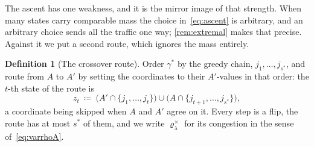 \documentclass[aos]{imsart}
\theoremstyle{plain}
\theoremstyle{definition}
\newtheorem{definition}{Definition}[section]
\begin{document}
    The ascent has one weakness, and it is the mirror image of that
    strength. When many states carry comparable mass the choice
    in~\eqref{eq:ascent} is arbitrary, and an arbitrary choice sends all the
    traffic one way; \cref{rem:extremal} makes that precise. Against it we
    put a second route, which ignores the mass entirely.

    \begin{definition}[The crossover route]
        \label{def:cross}
        Order $\gamma^{\ast}$ by the greedy chain, $j_1,\dots,j_{s^{\ast}}$,
        and route from $A$ to $A'$ by setting the coordinates to their
        $A'$-values in that order: the $t$-th state of the route is
        \begin{equation}
            \label{eq:crossstate}
            z_t\ \coloneq\ \bigl(A'\cap\{j_1,\dots,j_t\}\bigr)\cup
            \bigl(A\cap\{j_{t+1},\dots,j_{s^{\ast}}\}\bigr),
        \end{equation}
        a coordinate being skipped when $A$ and $A'$ agree on it. Every step
        is a flip, the route has at most $s^{\ast}$ of them, and we write
        $\varrho^{\times}_\lambda$ for its congestion in the sense
        of~\eqref{eq:varrhoA}.
    \end{definition}
\end{document}
